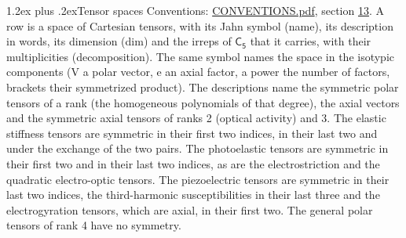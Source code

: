 \documentclass[10pt,a4paper]{article}
\makeatletter
\renewcommand\section{\@startsection{section}{1}{\z@}{-3ex plus -1ex minus -.2ex}%
  {1.2ex plus .2ex}{\normalfont\large\sffamily\bfseries\color{parttitle}}}
\numberwithin{equation}{section}
\newcommand{\grp}[1]{\mathsf{#1}}
\makeatother
\begin{document}
\section{Tensor spaces}\label{s:tensor_spaces}
Conventions: \href{../../CONVENTIONS.pdf}{CONVENTIONS.pdf}, section \href{../../CONVENTIONS.pdf\#conv.13}{13}.
\leavevmode\label{n:head.name}\label{n:head.description}\label{n:head.dim}\label{n:head.decomposition}A row is a space of Cartesian tensors, with its Jahn symbol (name), its description in words, its dimension (dim) and the irreps of $\grp{C_{5}}$ that it carries, with their multiplicities (decomposition). \label{n:label.jahn}The same symbol names the space in the isotypic components (V a polar vector, e an axial factor, a power the number of factors, brackets their symmetrized product). The descriptions name the symmetric polar tensors of a rank (the homogeneous polynomials of that degree), the axial vectors and the symmetric axial tensors of ranks 2 (optical activity) and 3. The elastic stiffness tensors are symmetric in their first two indices, in their last two and under the exchange of the two pairs. The photoelastic tensors are symmetric in their first two and in their last two indices, as are the electrostriction and the quadratic electro-optic tensors. The piezoelectric tensors are symmetric in their last two indices, the third-harmonic susceptibilities in their last three and the electrogyration tensors, which are axial, in their first two. The general polar tensors of rank 4 have no symmetry.
\end{document}
